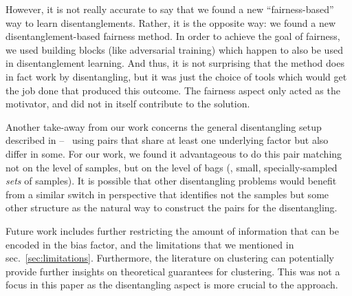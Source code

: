 However, it is not really accurate to say that
we found a new ``fairness-based'' way to learn disentanglements.
Rather, it is the opposite way: we found a new disentanglement-based fairness method.
In order to achieve the goal of fairness,
we used building blocks (like adversarial training)
which happen to also be used in disentanglement learning.
And thus, it is not surprising that the method does in fact work by disentangling,
but it was just the choice of tools which would get the job done that produced this outcome.
The fairness aspect only acted as the motivator, and did not in itself contribute to the solution.

Another take-away from our work concerns the general disentangling setup described in
\citet{locatello2020weakly}
-- \ie\ using pairs that share at least one underlying factor but also differ in some.
For our work, we found it advantageous to do this pair matching not on the level of samples,
but on the level of bags (\ie, small, specially-sampled \emph{sets} of samples).
It is possible that other disentangling problems would benefit
from a similar switch in perspective
that identifies not the samples but some other structure
as the natural way to construct the pairs for the disentangling.

Future work includes further restricting the amount of information that can be encoded in the bias factor, and the limitations that we mentioned in sec.~\ref{sec:limitations}.
Furthermore, the literature on clustering can potentially provide further insights on theoretical guarantees for clustering.
This was not a focus in this paper as the disentangling aspect is more crucial to the approach.





% 
% 


% 


